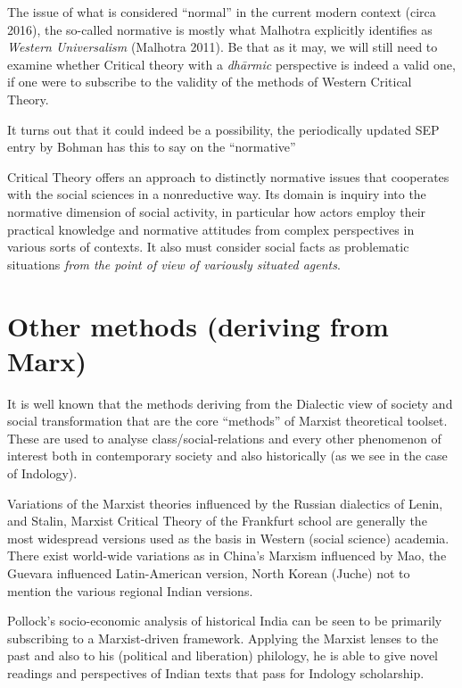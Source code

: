 The issue of what is considered ``normal'' in the current modern context (circa 2016), the so-called normative is mostly what Malhotra explicitly identifies as {\sl Western Universalism} (Malhotra 2011). Be that as it may, we will still need to examine whether Critical theory with a {\sl dhārmic} perspective is indeed a valid one, if one were to subscribe to the validity of the methods of Western Critical Theory.

It turns out that it could indeed be a possibility, the periodically updated SEP entry by Bohman has this to say on the ``normative''
\begin{myquote}
Critical Theory offers an approach to distinctly normative issues that cooperates with the social sciences in a nonreductive way. Its domain is inquiry into the normative dimension of social activity, in particular how actors employ their practical knowledge and normative attitudes from complex perspectives in various sorts of contexts. It also must consider social facts as problematic situations {{\sl from the point of view of variously situated agents}\relax}.
\end{myquote}

\newpage

\section*{Other methods (deriving from Marx)}

It is well known that the methods deriving  from the Dialectic view of society and social transformation that are the core ``methods'' of Marxist theoretical toolset. These are used to analyse class/social-relations and every other phenomenon of interest both in contemporary society and also historically (as we see in the case of Indology).

Variations of the Marxist theories influenced by the Russian dialectics of Lenin, and Stalin, Marxist Critical Theory of the Frankfurt school are generally the most widespread versions used as the basis in Western (social science) academia. There exist world-wide variations as in China's Marxism influenced by Mao, the Guevara influenced Latin-American version, North Korean (Juche) not to mention the various regional Indian versions.

Pollock's socio-economic analysis of historical India can be seen to be primarily subscribing to a Marxist-driven framework. Applying the Marxist lenses to the past and also to his (political and liberation) philology, he is able to give novel readings and perspectives of Indian texts that pass for Indology scholarship.

